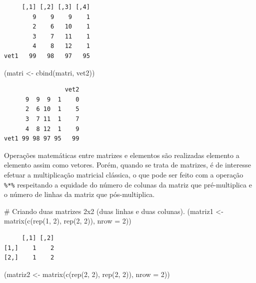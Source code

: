 \documentclass[
  letterpaper,
  DIV=11,
  numbers=noendperiod]{scrreprt}
\newenvironment{Shaded}{\begin{snugshade}}{\end{snugshade}}
\newcommand{\AttributeTok}[1]{\textcolor[rgb]{0.40,0.45,0.13}{#1}}
\newcommand{\CommentTok}[1]{\textcolor[rgb]{0.37,0.37,0.37}{#1}}
\newcommand{\DecValTok}[1]{\textcolor[rgb]{0.68,0.00,0.00}{#1}}
\newcommand{\FunctionTok}[1]{\textcolor[rgb]{0.28,0.35,0.67}{#1}}
\newcommand{\NormalTok}[1]{\textcolor[rgb]{0.00,0.23,0.31}{#1}}
\newcommand{\OtherTok}[1]{\textcolor[rgb]{0.00,0.23,0.31}{#1}}
\begin{document}
\begin{verbatim}
     [,1] [,2] [,3] [,4]
        9    9    9    1
        2    6   10    1
        3    7   11    1
        4    8   12    1
vet1   99   98   97   95
\end{verbatim}

\begin{Shaded}
\begin{Highlighting}[]
\NormalTok{(matri }\OtherTok{\textless{}{-}} \FunctionTok{cbind}\NormalTok{(matri, vet2))}
\end{Highlighting}
\end{Shaded}

\begin{verbatim}
                 vet2
      9  9  9  1    0
      2  6 10  1    5
      3  7 11  1    7
      4  8 12  1    9
vet1 99 98 97 95   99
\end{verbatim}

Operações matemáticas entre matrizes e elementos são realizadas elemento
a elemento assim como vetores. Porém, quando se trata de matrizes, é de
interesse efetuar a multiplicação matricial clássica, o que pode ser
feito com a operação \texttt{\%*\%} respeitando a equidade do número de
colunas da matriz que pré-multiplica e o número de linhas da matriz que
pós-multiplica.

\begin{Shaded}
\begin{Highlighting}[]
\CommentTok{\# Criando duas matrizes 2x2 (duas linhas e duas colunas).}
\NormalTok{(matriz1 }\OtherTok{\textless{}{-}} \FunctionTok{matrix}\NormalTok{(}\FunctionTok{c}\NormalTok{(}\FunctionTok{rep}\NormalTok{(}\DecValTok{1}\NormalTok{, }\DecValTok{2}\NormalTok{), }\FunctionTok{rep}\NormalTok{(}\DecValTok{2}\NormalTok{, }\DecValTok{2}\NormalTok{)), }\AttributeTok{nrow =} \DecValTok{2}\NormalTok{))}
\end{Highlighting}
\end{Shaded}

\begin{verbatim}
     [,1] [,2]
[1,]    1    2
[2,]    1    2
\end{verbatim}

\begin{Shaded}
\begin{Highlighting}[]
\NormalTok{(matriz2 }\OtherTok{\textless{}{-}} \FunctionTok{matrix}\NormalTok{(}\FunctionTok{c}\NormalTok{(}\FunctionTok{rep}\NormalTok{(}\DecValTok{2}\NormalTok{, }\DecValTok{2}\NormalTok{), }\FunctionTok{rep}\NormalTok{(}\DecValTok{2}\NormalTok{, }\DecValTok{2}\NormalTok{)), }\AttributeTok{nrow =} \DecValTok{2}\NormalTok{))}
\end{Highlighting}
\end{Shaded}
\end{document}
